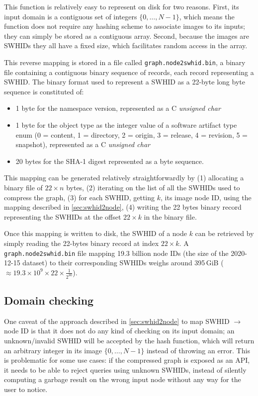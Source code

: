 This function is relatively easy to represent on disk for two reasons. First,
its input domain is a contiguous set of integers $\{0,\ldots,N-1\}$, which
means the function does not require any hashing scheme to associate images to
its inputs; they can simply be stored as a contiguous array. Second, because
the images are \glspl{SWHID} they all have a fixed size, which facilitates
random access in the array.

This reverse mapping is stored in a file called \texttt{graph.node2swhid.bin},
a binary file containing a contiguous binary sequence of records, each record
representing a \gls{SWHID}. The binary format used to represent a \gls{SWHID}
as a 22-byte long byte sequence is constituted of:

\begin{itemize}
    \item 1 byte for the namespace version, represented as a C \emph{unsigned
        char}
    \item 1 byte for the object type as the integer value of a software
        artifact type enum (0 = content, 1 = directory, 2 = origin, 3 =
        release, 4 = revision, 5 = snapshot), represented as a C \emph{unsigned
        char}
    \item 20 bytes for the SHA-1 digest represented as a byte sequence.
\end{itemize}

This mapping can be generated relatively straightforwardly by (1) allocating a
binary file of $22 \times n$ bytes, (2) iterating on the list of all the
\glspl{SWHID} used to compress the graph, (3) for each \gls{SWHID}, getting
$k$, its image node ID, using the mapping described in \cref{sec:swhid2node},
(4) writing the 22 bytes binary record representing the \glspl{SWHID} at the
offset $22 \times k$ in the binary file.

Once this mapping is written to disk, the \gls{SWHID} of a node $k$ can be
retrieved by simply reading the 22-bytes binary record at index $22 \times k$.
A \texttt{graph.node2swhid.bin} file mapping 19.3 billion node IDs (the size of
the 2020-12-15 dataset) to their corresponding \glspl{SWHID} weighs
around 395\,GiB ($\approx 19.3 \times 10^9 \times 22 \times \frac{1}{2^{30}}$).

\subsection{Domain checking}

One caveat of the approach described in \cref{sec:swhid2node} to map
\gls{SWHID} $\to$ node ID is that it does not do any kind of checking on its
input domain; an unknown/invalid \gls{SWHID} will be accepted by the hash
function, which will return an arbitrary integer in its image
$\{0,\ldots,N-1\}$ instead of throwing an error. This is problematic for some
use cases: if the compressed graph is exposed as an API, it needs to be able to
reject queries using unknown \glspl{SWHID}, instead of silently computing a
garbage result on the wrong input node without any way for the user to notice.

